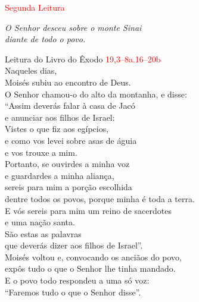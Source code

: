 \documentclass{book}
\begin{document}
\begin{flushleft}
\end{flushleft}

\begin{center}

    \textcolor{red}{Segunda Leitura}

\end{center}

\begin{flushright}
    \textit{O Senhor desceu sobre o monte Sinai \\ diante de todo o povo.}
\end{flushright}

\begin{flushleft}

    \vspace{0.2cm}
    Leitura do Livro do Êxodo
    \hspace{\fill}
    \textcolor{red}{19,3--8a.16--20b}
    \vspace{0.2cm} \\
    Naqueles dias, \\
    Moisés subiu ao encontro de Deus. \\
    O Senhor chamou-o do alto da montanha, e disse: \\
    ``Assim deverás falar à casa de Jacó \\
    e anunciar aos filhos de Israel: \\
    Vistes o que fiz aos egípcios, \\
    e como vos levei sobre asas de águia \\
    e vos trouxe a mim. \\
    Portanto, se ouvirdes a minha voz \\
    e guardardes a minha aliança, \\
    sereis para mim a porção escolhida \\
    dentre todos os povos, porque minha é toda a terra. \\
    E vós sereis para mim um reino de sacerdotes \\
    e uma nação santa. \\
    São estas as palavras \\
    que deverás dizer aos filhos de Israel''. \\
    Moisés voltou e, convocando os anciãos do povo, \\
    expôs tudo o que o Senhor lhe tinha mandado. \\
    E o povo todo respondeu a uma só voz: \\
    ``Faremos tudo o que o Senhor disse''. \\

\end{flushleft}
\end{document}

